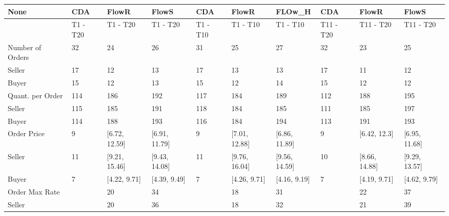 \begin{tabular}{llllllllll}
\hline
 None                   & CDA      & FlowR         & FlowS         & CDA      & FlowR         & FLOw\_H        & CDA       & FlowR         & FlowS         \\
\hline
                        & T1 - T20 & T1 - T20      & T1 - T20      & T1 - T10 & T1 - T10      & T1 - T10      & T11 - T20 & T11 - T20     & T11 - T20     \\
 Number of Orders       & 32       & 24            & 26            & 31       & 25            & 27            & 32        & 23            & 25            \\
 Seller                 & 17       & 12            & 13            & 17       & 13            & 13            & 17        & 11            & 12            \\
 Buyer                  & 15       & 12            & 13            & 15       & 12            & 14            & 15        & 12            & 12            \\
 Quant. per Order       & 114      & 186           & 192           & 117      & 184           & 189           & 112       & 188           & 195           \\
 Seller                 & 115      & 185           & 191           & 118      & 184           & 185           & 111       & 185           & 197           \\
 Buyer                  & 114      & 188           & 193           & 116      & 184           & 194           & 113       & 191           & 193           \\
 Order Price            & 9        & [6.72, 12.59] & [6.91, 11.79] & 9        & [7.01, 12.88] & [6.86, 11.89] & 9         & [6.42, 12.3]  & [6.95, 11.68] \\
 Seller                 & 11       & [9.21, 15.46] & [9.43, 14.08] & 11       & [9.76, 16.04] & [9.56, 14.59] & 10        & [8.66, 14.88] & [9.29, 13.57] \\
 Buyer                  & 7        & [4.22, 9.71]  & [4.39, 9.49]  & 7        & [4.26, 9.71]  & [4.16, 9.19]  & 7         & [4.19, 9.71]  & [4.62, 9.79]  \\
 Order Max Rate         &          & 20            & 34            &          & 18            & 31            &           & 22            & 37            \\
 Seller                 &          & 20            & 36            &          & 18            & 32            &           & 21            & 39            \\

\end{tabular}
